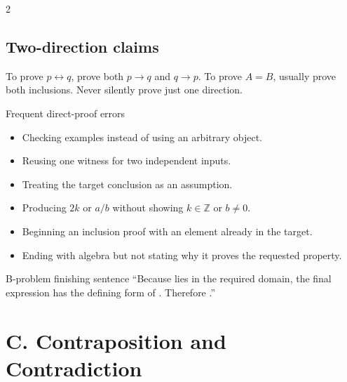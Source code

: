 \documentclass[10pt]{article}
\newcommand{\Z}{\mathbb Z}
\begin{document}
\begin{multicols}{2}
\subsection*{Two-direction claims}
To prove $p\leftrightarrow q$, prove both $p\to q$ and $q\to p$. To prove
$A=B$, usually prove both inclusions. Never silently prove just one direction.

\begin{warningbox}{Frequent direct-proof errors}
\begin{itemize}
  \item Checking examples instead of using an arbitrary object.
  \item Reusing one witness for two independent inputs.
  \item Treating the target conclusion as an assumption.
  \item Producing $2k$ or $a/b$ without showing $k\in\Z$ or $b\ne0$.
  \item Beginning an inclusion proof with an element already in the target.
  \item Ending with algebra but not stating why it proves the requested property.
\end{itemize}
\end{warningbox}

\begin{checklistbox}{B-problem finishing sentence}
``Because \underline{\hspace{0.7in}} lies in the required domain, the final
expression has the defining form of \underline{\hspace{0.7in}}. Therefore
\underline{\hspace{0.8in}}.''
\end{checklistbox}
\end{multicols}

\clearpage
\section*{C. Contraposition and Contradiction}
\end{document}
